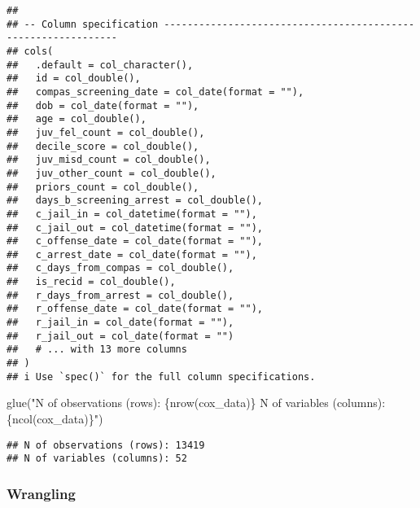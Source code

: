 \documentclass[
]{book}
\newenvironment{Shaded}{\begin{snugshade}}{\end{snugshade}}
\newcommand{\FunctionTok}[1]{\textcolor[rgb]{0.00,0.00,0.00}{#1}}
\newcommand{\NormalTok}[1]{#1}
\newcommand{\StringTok}[1]{\textcolor[rgb]{0.31,0.60,0.02}{#1}}
\begin{document}
\begin{verbatim}
## 
## -- Column specification --------------------------------------------------------------
## cols(
##   .default = col_character(),
##   id = col_double(),
##   compas_screening_date = col_date(format = ""),
##   dob = col_date(format = ""),
##   age = col_double(),
##   juv_fel_count = col_double(),
##   decile_score = col_double(),
##   juv_misd_count = col_double(),
##   juv_other_count = col_double(),
##   priors_count = col_double(),
##   days_b_screening_arrest = col_double(),
##   c_jail_in = col_datetime(format = ""),
##   c_jail_out = col_datetime(format = ""),
##   c_offense_date = col_date(format = ""),
##   c_arrest_date = col_date(format = ""),
##   c_days_from_compas = col_double(),
##   is_recid = col_double(),
##   r_days_from_arrest = col_double(),
##   r_offense_date = col_date(format = ""),
##   r_jail_in = col_date(format = ""),
##   r_jail_out = col_date(format = "")
##   # ... with 13 more columns
## )
## i Use `spec()` for the full column specifications.
\end{verbatim}

\begin{Shaded}
\begin{Highlighting}[]
\FunctionTok{glue}\NormalTok{(}\StringTok{"N of observations (rows): \{nrow(cox\_data)\}}
\StringTok{      N of variables (columns): \{ncol(cox\_data)\}"}\NormalTok{)}
\end{Highlighting}
\end{Shaded}

\begin{verbatim}
## N of observations (rows): 13419
## N of variables (columns): 52
\end{verbatim}

\hypertarget{wrangling-2}{%
\subsubsection{Wrangling}\label{wrangling-2}}
\end{document}
